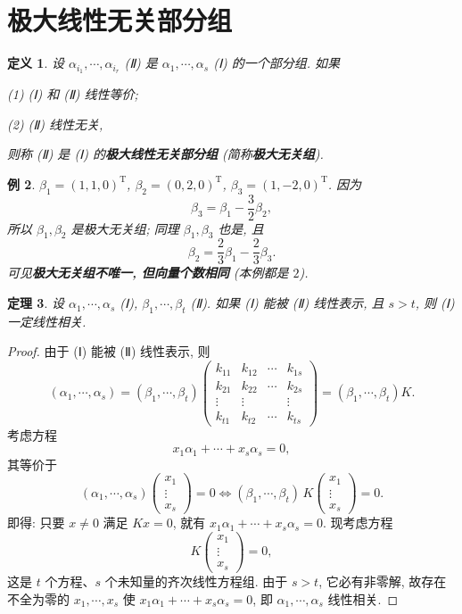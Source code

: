 \documentclass[UTF8,11pt]{ctexart}
\theoremstyle{cnthm}
\newtheorem{thm}{定理}[section]
\newtheorem{defn}[thm]{定义}
\newtheorem{exa}[thm]{例}
\begin{document}
\section{极大线性无关部分组}

\begin{defn}
设 $\alpha_{i_1},\cdots,\alpha_{i_r}$ (Ⅱ) 是 $\alpha_1,\cdots,\alpha_s$ (Ⅰ) 的一个部分组. 如果

(1) (Ⅰ) 和 (Ⅱ) 线性等价;

(2) (Ⅱ) 线性无关,

则称 (Ⅱ) 是 (Ⅰ) 的\textbf{极大线性无关部分组} (简称\textbf{极大无关组}).
\end{defn}

\begin{exa}
$\beta_1=(1,1,0)^{\mathrm T}$, $\beta_2=(0,2,0)^{\mathrm T}$, $\beta_3=(1,-2,0)^{\mathrm T}$. 因为
\[
\beta_3=\beta_1-\frac32\beta_2,
\]
所以 $\beta_1,\beta_2$ 是极大无关组; 同理 $\beta_1,\beta_3$ 也是, 且
\[
\beta_2=\frac23\beta_1-\frac23\beta_3 .
\]
可见\textbf{极大无关组不唯一, 但向量个数相同} (本例都是 $2$).
\end{exa}

\begin{thm}
设 $\alpha_1,\cdots,\alpha_s$ (Ⅰ), $\beta_1,\cdots,\beta_t$ (Ⅱ). 如果 (Ⅰ) 能被 (Ⅱ) 线性表示, 且 $s>t$, 则 (Ⅰ) 一定线性相关.
\end{thm}

\begin{proof}
由于 (Ⅰ) 能被 (Ⅱ) 线性表示, 则
\[
(\alpha_1,\cdots,\alpha_s)=(\beta_1,\cdots,\beta_t)
\begin{pmatrix}
k_{11} & k_{12} & \cdots & k_{1s}\\
k_{21} & k_{22} & \cdots & k_{2s}\\
\vdots & \vdots & & \vdots\\
k_{t1} & k_{t2} & \cdots & k_{ts}
\end{pmatrix}
=(\beta_1,\cdots,\beta_t)K .
\]
考虑方程
\[
x_1\alpha_1+\cdots+x_s\alpha_s=0,
\]
其等价于
\[
(\alpha_1,\cdots,\alpha_s)\begin{pmatrix}x_1\\\vdots\\x_s\end{pmatrix}=0
\iff
(\beta_1,\cdots,\beta_t)\,K\begin{pmatrix}x_1\\\vdots\\x_s\end{pmatrix}=0 .
\]
即得: 只要 $x\neq0$ 满足 $Kx=0$, 就有 $x_1\alpha_1+\cdots+x_s\alpha_s=0$. 现考虑方程
\[
K\begin{pmatrix}x_1\\\vdots\\x_s\end{pmatrix}=0 ,
\]
这是 $t$ 个方程、$s$ 个未知量的齐次线性方程组. 由于 $s>t$, 它必有非零解, 故存在不全为零的 $x_1,\cdots,x_s$ 使 $x_1\alpha_1+\cdots+x_s\alpha_s=0$, 即 $\alpha_1,\cdots,\alpha_s$ 线性相关.
\end{proof}
\end{document}
